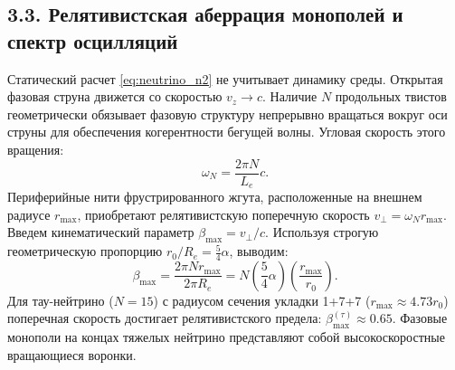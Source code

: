 \documentclass[12pt,a4paper]{article}
\begin{document}
	\subsection{3.3. Релятивистская аберрация монополей и спектр осцилляций}
	Статический расчет \eqref{eq:neutrino_n2} не учитывает динамику среды. Открытая фазовая струна движется со скоростью $v_z \to c$. Наличие $N$ продольных твистов геометрически обязывает фазовую структуру непрерывно вращаться вокруг оси струны для обеспечения когерентности бегущей волны. Угловая скорость этого вращения:
	\begin{equation}
		\omega_N = \frac{2\pi N}{L_e} c.
	\end{equation}
	Периферийные нити фрустрированного жгута, расположенные на внешнем радиусе $r_{\text{max}}$, приобретают релятивистскую поперечную скорость $v_\perp = \omega_N r_{\text{max}}$. Введем кинематический параметр $\beta_{\text{max}} = v_\perp / c$. Используя строгую геометрическую пропорцию $r_0/R_e = \frac{5}{4}\alpha$, выводим:
	\begin{equation}
		\beta_{\text{max}} = \frac{2\pi N r_{\text{max}}}{2\pi R_e} = N \left( \frac{5}{4}\alpha \right) \left( \frac{r_{\text{max}}}{r_0} \right).
	\end{equation}
	Для тау-нейтрино ($N=15$) с радиусом сечения укладки 1+7+7 ($r_{\text{max}} \approx 4.73 r_0$) поперечная скорость достигает релятивистского предела: $\beta_{\text{max}}^{(\tau)} \approx 0.65$. Фазовые монополи на концах тяжелых нейтрино представляют собой высокоскоростные вращающиеся воронки.
	
\end{document}
